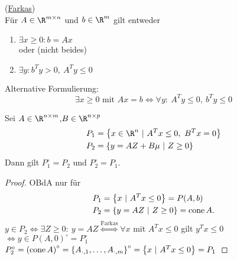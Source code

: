 \begin{lemma}
	(\underline{Farkas})\\
	Für $A \in \R^{m \times n}$ und $b \in \R^m$ gilt entweder
	\begin{enumerate}[label = (\alph*)]
		\item $\exists x \geq 0: b= Ax$\\
			oder (nicht beides)
		\item  $\exists y: b^{T} y > 0,\ A^{T} y \leq 0$
	\end{enumerate}
	Alternative Formulierung:
	\begin{equation*}
		\exists x \geq 0 \text{ mit } Ax=b \iff \forall y:\ A^{T} y \leq 0,\ b^{T} y \leq 0
	\end{equation*}
\end{lemma}
\begin{satz}
	Sei $A\in \R^{n \times m}$,$B \in \R^{n \times p}$
	 \begin{align*}
		 P_{1} &= \left\{ x \in \R^n \ |\ A^{T} x \leq 0,\ B^{T} x =0 \right\}\\
		 P_{2} &= \left\{ y = AZ + B\mu\ |\ Z \geq 0\right\}\\
	\end{align*}
	Dann gilt $P_{1}^\circ = P_{2}$ und $P_{2}^\circ = P_{1}$.
\end{satz}
\begin{proof}
	OBdA nur für 
	\begin{align*}
		P_{1} &= \left\{ x \ |\ A^{T} x \leq 0 \right\} = P(A,b)\\
		P_{2} &= \left\{ y = AZ \ |\ Z \geq 0 \right\}= \operatorname{cone} A.
	\end{align*}
	$y\in P_{2} \iff \exists Z \geq 0 : \ y = AZ \overset{\text{Farkas}}{\iff} \forall x$ mit $A^{T} x \leq 0$ gilt $y^{T} x \leq 0$ $\iff y \in P(A,0)^\circ=P_{1}^\circ$\\
	$P_{2}^\circ = \left( \cone A \right)^\circ = \left\{ A_{\cdot,1},\dots ,A_{\cdot,m} \right\}^\circ = \left\{x \ |\ A^{T} x \leq 0 \right\} = P_{1}$
\end{proof}



